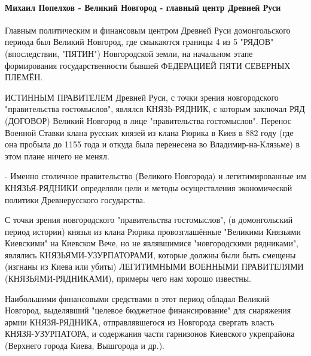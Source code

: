  
 
 
 
 
\paragraph{Михаил Попелхов - Великий Новгород - главный центр Древней Руси}
\label{sec:14_07_2021.fb.krjukova_svetlana.1.statja_putina_mnenie.cmt.popelhov_novgorod}

\begin{itemize}
 

Главным политическим и финансовым центром Древней Руси домонгольского периода
был Великий Новгород, где смыкаются границы 4 из 5 "РЯДОВ" (впоследствии,
"ПЯТИН") Новгородской земли, на начальном этапе формирования государственности
бывшей ФЕДЕРАЦИЕЙ ПЯТИ СЕВЕРНЫХ ПЛЕМЁН. 

ИСТИННЫМ ПРАВИТЕЛЕМ Древней Руси, с точки зрения новгородского "правительства
гостомыслов", являлся КНЯЗЬ-РЯДНИК, с которым заключал РЯД (ДОГОВОР) Великий
Новгород в лице "правительства гостомыслов". Перенос Военной Ставки клана
русских князей из клана Рюрика в Киев в 882 году (где она пробыла до 1155 года
и откуда была перенесена во Владимир-на-Клязьме) в этом плане ничего не менял. 

- Именно столичное правительство (Великого Новгорода) и легитимированные им
КНЯЗЬЯ-РЯДНИКИ определяли цели и методы осуществления экономической политики
Древнерусского государства. 

С точки зрения новгородского "правительства гостомыслов", (в
домонгольский период истории) князья из клана Рюрика провозглашённые "Великими
Князьями Киевскими" на Киевском Вече, но не являвшимися "новгородскими
рядниками", являлись КНЯЗЬЯМИ-УЗУРПАТОРАМИ, которые должны были быть смещены
(изгнаны из Киева или убиты) ЛЕГИТИМНЫМИ ВОЕННЫМИ ПРАВИТЕЛЯМИ
(КНЯЗЬЯМИ-РЯДНИКАМИ), примеры чего нам хорошо известны. 

Наибольшими финансовыми
средствами в этот период обладал Великий Новгород, выделявший "целевое
бюджетное финансирование" для снаряжения армии КНЯЗЯ-РЯДНИКА, отправлявшегося
из Новгорода свергать власть КНЯЗЯ-УЗУРПАТОРА, и содержания части гарнизонов
Киевского укрепрайона (Верхнего города Киева, Вышгорода и др.). 


\end{itemize}
